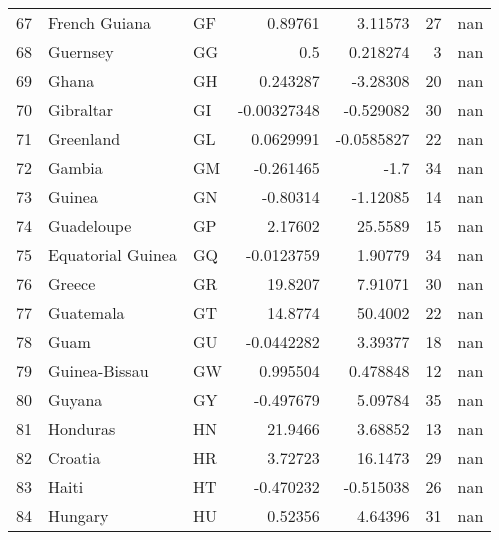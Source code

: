 \begin{tabular}{rllrrrr}
 67 & French Guiana              & GF         &    0.89761    &     3.11573   &     27 &          nan \\
 68 & Guernsey                   & GG         &    0.5        &     0.218274  &      3 &          nan \\
 69 & Ghana                      & GH         &    0.243287   &    -3.28308   &     20 &          nan \\
 70 & Gibraltar                  & GI         &   -0.00327348 &    -0.529082  &     30 &          nan \\
 71 & Greenland                  & GL         &    0.0629991  &    -0.0585827 &     22 &          nan \\
 72 & Gambia                     & GM         &   -0.261465   &    -1.7       &     34 &          nan \\
 73 & Guinea                     & GN         &   -0.80314    &    -1.12085   &     14 &          nan \\
 74 & Guadeloupe                 & GP         &    2.17602    &    25.5589    &     15 &          nan \\
 75 & Equatorial Guinea          & GQ         &   -0.0123759  &     1.90779   &     34 &          nan \\
 76 & Greece                     & GR         &   19.8207     &     7.91071   &     30 &          nan \\
 77 & Guatemala                  & GT         &   14.8774     &    50.4002    &     22 &          nan \\
 78 & Guam                       & GU         &   -0.0442282  &     3.39377   &     18 &          nan \\
 79 & Guinea-Bissau              & GW         &    0.995504   &     0.478848  &     12 &          nan \\
 80 & Guyana                     & GY         &   -0.497679   &     5.09784   &     35 &          nan \\
 81 & Honduras                   & HN         &   21.9466     &     3.68852   &     13 &          nan \\
 82 & Croatia                    & HR         &    3.72723    &    16.1473    &     29 &          nan \\
 83 & Haiti                      & HT         &   -0.470232   &    -0.515038  &     26 &          nan \\
 84 & Hungary                    & HU         &    0.52356    &     4.64396   &     31 &          nan \\

\end{tabular}
